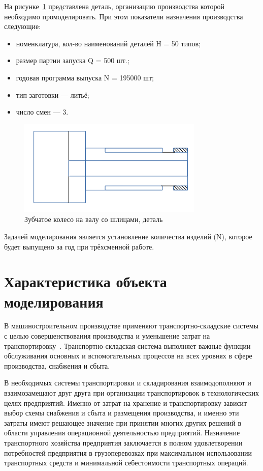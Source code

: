 На рисунке~\ref{fig:detail} представлена деталь, организацию производства которой необходимо промоделировать. При этом показатели назначения производства следующие:

\begin{itemize}
    \item номенклатура, кол-во наименований деталей Н = 50 типов;
    \item размер партии запуска Q = 500 шт.;
    \item годовая программа выпуска N = 195000 шт;
    \item тип заготовки --- литьё;
    \item число смен --- 3.
\end{itemize}

\begin{figure}[ht]
    \includegraphics[width=.6\linewidth]{Figures/detail.png}
    \caption{Зубчатое колесо на валу со шлицами, деталь}
    \label{fig:detail}
\end{figure}

Задачей моделирования является установление количества изделий (N), которое будет выпущено за год при трёхсменной работе.

\section{Характеристика объекта моделирования}

В машиностроительном производстве применяют транспортно-складские системы с целью совершенствования производства и уменьшение затрат на транспортировку~\cite{kogan:transport}. Транспортно-складская система выполняет важные функции обслуживания основных и вспомогательных процессов на всех уровнях в сфере производства, снабжения и сбыта.

В необходимых системы транспортировки и складирования взаимодополняют и взаимозамещают друг друга при организации транспортировок в технологических целях предприятий. Именно от затрат на хранение и транспортировку зависит выбор схемы снабжения и сбыта и размещения производства, и именно эти затраты имеют решающее значение при принятии многих других решений в области управления операционной деятельностью предприятий. Назначение транспортного хозяйства предприятия заключается в полном удовлетворении потребностей предприятия в грузоперевозках при максимальном использовании транспортных средств и минимальной себестоимости транспортных операций.

